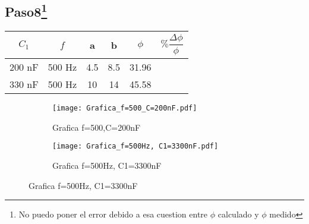 \documentclass[a4paper,12pt]{article}
\begin{document}
\subsection*{Paso8\footnote{No puedo poner el error debido a esa cuestion entre $\phi$ calculado y $\phi$ medido  }}

\begin{center}
 \begin{tabular}{|c| c | c | c | c | c |} 
 \hline
 $C_1$ & $f$ & a & b & $\phi$  	& $\% \dfrac{\Delta \phi}{\phi} $ \\  
 \hline\hline
 200 nF & 500 Hz & 4.5 & 8.5 & 31.96 &  \\   
 \hline
 330 nF & 500 Hz & 10 &  14 & 45.58 &  \\  
 \hline 
\end{tabular}
\end{center}	


\begin{figure}[H]
     \centering
     \begin{subfigure}[b]{0.3\textwidth}
         \centering
         \texttt{[image: Grafica\_f=500\_C=200nF.pdf]}
         \caption{Grafica f=500,C=200nF}
     \end{subfigure}
     \begin{subfigure}[b]{0.3\textwidth}
         \centering
         \texttt{[image: Grafica\_f=500Hz, C1=3300nF.pdf]}
         \caption{Grafica f=500Hz, C1=3300nF}
     \end{subfigure}
\end{figure}


  
\end{document}
